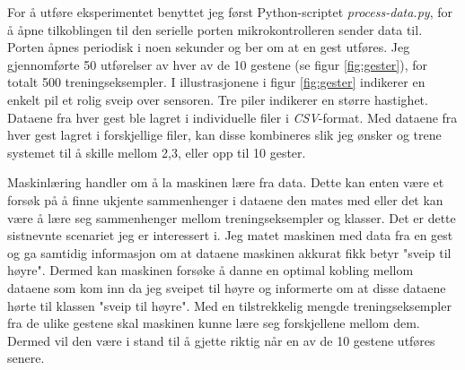 For å utføre eksperimentet benyttet jeg først Python-scriptet \emph{process-data.py}, for å åpne tilkoblingen til den serielle porten mikrokontrolleren sender data til. Porten åpnes periodisk i noen sekunder og ber om at en gest utføres. Jeg gjennomførte 50 utførelser av hver av de 10 gestene (se figur \ref{fig:gester}), for totalt 500 treningseksempler. I illustrasjonene i figur \ref{fig:gester} indikerer en enkelt pil et rolig sveip over sensoren. Tre piler indikerer en større hastighet. Dataene fra hver gest ble lagret i individuelle filer i \emph{CSV}-format. Med dataene fra hver gest lagret i forskjellige filer, kan disse kombineres slik jeg ønsker og trene systemet til å skille mellom 2,3, eller opp til 10 gester. 

Maskinlæring handler om å la maskinen lære fra data. Dette kan enten være et forsøk på å finne ukjente sammenhenger i dataene den mates med eller det kan være å lære seg sammenhenger mellom treningseksempler og klasser. Det er dette sistnevnte scenariet jeg er interessert i. Jeg matet maskinen med data fra en gest og ga samtidig informasjon om at dataene maskinen akkurat fikk betyr "sveip til høyre". Dermed kan maskinen forsøke å danne en optimal kobling mellom dataene som kom inn da jeg sveipet til høyre og informerte om at disse dataene hørte til klassen "sveip til høyre". Med en tilstrekkelig mengde treningseksempler fra de ulike gestene skal maskinen kunne lære seg forskjellene mellom dem. Dermed vil den være i stand til å gjette riktig når en av de 10 gestene utføres senere.
